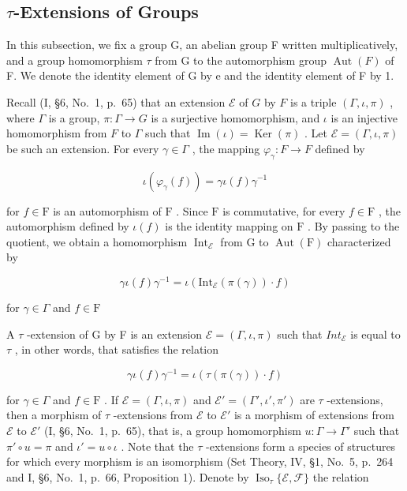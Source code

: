 \subsection{\texorpdfstring{\(\tau\)-Extensions of Groups}{\textbackslash tau-Extensions of Groups}}

In this subsection, we fix a group G, an abelian group F written multiplicatively, and a group homomorphism \(\tau\) from G to the automorphism group \(\operatorname{Aut}(F)\) of F. We denote the identity element of G by e and the identity element of F by 1.

Recall (I, §6, No.~1, p.~65) that an extension \(\mathcal{E}\) of \(G\) by \(F\) is a triple \((\Gamma, \iota, \pi)\) , where \(\Gamma\) is a group, \(\pi: \Gamma \to G\) is a surjective homomorphism, and \(\iota\) is an injective homomorphism from \(F\) to \(\Gamma\) such that \(\operatorname{Im}(\iota) = \operatorname{Ker}(\pi)\) . Let \(\mathcal{E} = (\Gamma, \iota, \pi)\) be such an extension. For every \(\gamma \in \Gamma\) , the mapping \(\varphi_{\gamma}: F \to F\) defined by

\[
\iota (\varphi_ {\gamma} (f)) = \gamma \iota (f) \gamma^ {- 1}
\]

for \(f \in \mathrm{F}\) is an automorphism of \(\mathrm{F}\) . Since \(\mathrm{F}\) is commutative, for every \(f \in \mathrm{F}\) , the automorphism defined by \(\iota(f)\) is the identity mapping on \(\mathrm{F}\) . By passing to the quotient, we obtain a homomorphism \(\operatorname{Int}_{\mathcal{E}}\) from \(\mathrm{G}\) to \(\operatorname{Aut}(\mathrm{F})\) characterized by

\[
\gamma \iota (f) \gamma^ {- 1} = \iota (\mathrm{Int} _ {\mathcal {E}} (\pi (\gamma)) \cdot f)
\]

for \(\gamma \in \Gamma\) and \(f\in \mathrm{F}\)

A \(\tau\) -extension of G by F is an extension \(\mathcal{E} = (\Gamma, \iota, \pi)\) such that \(Int_{\mathcal{E}}\) is equal to \(\tau\) , in other words, that satisfies the relation

\[
\gamma \iota (f) \gamma^ {- 1} = \iota (\tau (\pi (\gamma)) \cdot f)\tag{1}
\]

for \(\gamma \in \Gamma\) and \(f \in \mathrm{F}\) . If \(\mathcal{E} = (\Gamma, \iota, \pi)\) and \(\mathcal{E}' = (\Gamma', \iota', \pi')\) are \(\tau\) -extensions, then a morphism of \(\tau\) -extensions from \(\mathcal{E}\) to \(\mathcal{E}'\) is a morphism of extensions from \(\mathcal{E}\) to \(\mathcal{E}'\) (I, §6, No.~1, p.~65), that is, a group homomorphism \(u: \Gamma \to \Gamma'\) such that \(\pi' \circ u = \pi\) and \(\iota' = u \circ \iota\) . Note that the \(\tau\) -extensions form a species of structures for which every morphism is an isomorphism (Set Theory, IV, §1, No.~5, p.~264 and I, §6, No.~1, p.~66, Proposition 1). Denote by \(\operatorname{Iso}_{\tau} \{\mathcal{E}, \mathcal{F}\}\) the relation

